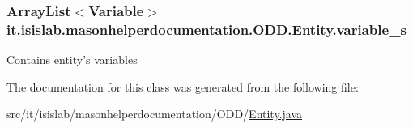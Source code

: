 \hypertarget{classit_1_1isislab_1_1masonhelperdocumentation_1_1_o_d_d_1_1_entity_a32a30da644c3d9ef1a3d04b6b5b8346f}{
\subsubsection[{variable\-\_\-s}]{\setlength{\rightskip}{0pt plus 5cm}Array\-List$<${\bf Variable}$>$ it.\-isislab.\-masonhelperdocumentation.\-O\-D\-D.\-Entity.\-variable\-\_\-s\hspace{0.3cm}{\ttfamily [private]}}}\label{classit_1_1isislab_1_1masonhelperdocumentation_1_1_o_d_d_1_1_entity_a32a30da644c3d9ef1a3d04b6b5b8346f}
Contains entity's variables 

The documentation for this class was generated from the following file\-:\begin{DoxyCompactItemize}
\item 
src/it/isislab/masonhelperdocumentation/\-O\-D\-D/\hyperlink{_entity_8java}{Entity.\-java}\end{DoxyCompactItemize}
